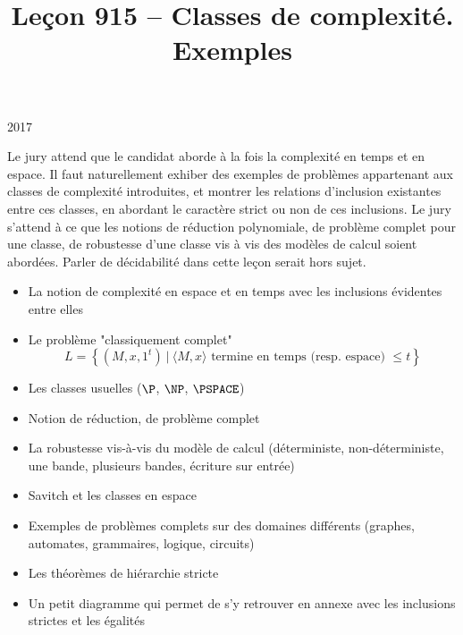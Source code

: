 \documentclass{agregfiche}
\title{Leçon 915 -- Classes de complexité. Exemples}
\begin{document}
\maketitle

\secrapports

\begin{rapport}{2017}

Le jury attend que le candidat aborde à la fois la complexité en temps et en
espace. Il faut naturellement exhiber des exemples de problèmes appartenant aux
classes de complexité introduites, et montrer les relations d’inclusion
existantes entre ces classes, en abordant le caractère strict ou non de ces
inclusions. Le jury s’attend à ce que les notions de réduction polynomiale, de
problème complet pour une classe, de robustesse d’une classe vis à vis des
modèles de calcul soient abordées. Parler de décidabilité dans cette leçon
serait hors sujet.

\end{rapport}

\secindispensables

\begin{itemize}
    \item La notion de complexité en espace et en temps
        avec les inclusions évidentes entre elles
    \item Le problème "classiquement complet"
        \begin{equation}
            L = \left\{ (M, x, 1^t) ~|~ \langle M, x \rangle \text{ termine en
                temps (resp. espace) }\leq t
            \right\}
        \end{equation}
    \item Les classes usuelles ($\P$, $\NP$, $\PSPACE$)
    \item Notion de réduction, de problème complet

\end{itemize}

\secasavoir

\begin{itemize}

	\item La robustesse vis-à-vis du modèle de calcul 
	(déterministe, non-déterministe, une bande, plusieurs 
	bandes, écriture sur entrée)
	\item Savitch et les classes en espace
	\item Exemples de problèmes complets sur des 
	domaines différents (graphes, automates,
	grammaires, logique, circuits)
	\item Les théorèmes de hiérarchie stricte
	\item Un petit diagramme qui permet de s'y retrouver 
	en annexe avec les inclusions strictes et les égalités
\end{itemize}
\end{document}
